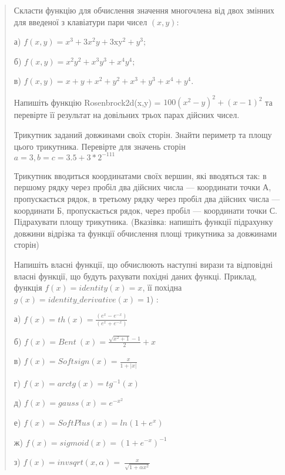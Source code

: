 \documentclass[]{article}
\begin{document}
\begin{quote}
Скласти функцію для обчислення значення многочлена від двох змінних для
введеної з клавіатури пари чисел \((x,y)\):

а)
\(f\left( x,y \right) = x^{3} + 3x^{2}y + 3\mathrm{\text{xy}}^{2} + y^{3};\)

б) \(f\left( x,y \right) = x^{2}y^{2} + x^{3}y^{3} + x^{4}y^{4};\)

в)
\(f\left( x,y \right) = x + y + x^{2} + y^{2} + x^{3} + y^{3} + x^{4} + y^{4}\mathrm{.}\)

Напишіть функцію Rosenbrock2d(x,y) =
\(100(x^{2} - y)^{2} + (x - 1)^{2}\) та перевірте її результат на
довільних трьох парах дійсних чисел.

Трикутник заданий довжинами своїх сторін. Знайти периметр та площу цього
трикутника. Перевірте для значень сторін
\(a = 3,b = c = 3.5 + 3*2^{- 111}\)

Трикутник вводиться координатами своїх вершин, які вводяться так: в
першому рядку через пробіл два дійсних числа --- координати точки А,
пропускається рядок, в третьому рядку через пробіл два дійсних числа ---
координати Б, пропускається рядок, через пробіл --- координати точки С.
Підрахувати площу трикутника. (Вказівка: напишіть функції підрахунку
довжини відрізка та функції обчислення площі трикутника за довжинами
сторін)

Напишіть власні функції, що обчислюють наступні вирази та відповідні
власні функції, що будуть рахувати похідні даних функці. Приклад,
функція \(f\left( x \right) = identity\left( x \right) = x\), її похідна
\(g\left( x \right) = identity\_ derivative\left( x \right) = 1\)) :

а)
\(f\left( x \right) = th\left( x \right) = \frac{(e^{x} - e^{- x})}{(e^{x} + e^{- x})}\)

б)
\(f\left( x \right) = Bent\ \left( x \right) = \frac{\sqrt{x^{2} + 1} - 1}{2} + x\)

в)
\(f\left( x \right) = Softsign\left( x \right) = \frac{x}{1 + \left| x \right|}\)

г) \(f\left( x \right) = arctg\left( x \right) = tg^{- 1}(x)\)

д) \(f\left( x \right) = gauss\left( x \right) = e^{- x^{2}}\)

е) \(f\left( x \right) = SoftPlus\left( x \right) = ln(1 + e^{x})\)

ж) \(f\left( x \right) = sigmoid\left( x \right) = (1 + e^{- x})^{- 1}\)

з)
\(f\left( x \right) = invsqrt(x,\alpha) = \ \frac{x}{\sqrt{1 + \alpha x^{2}}}\)


\end{quote}
\end{document}

